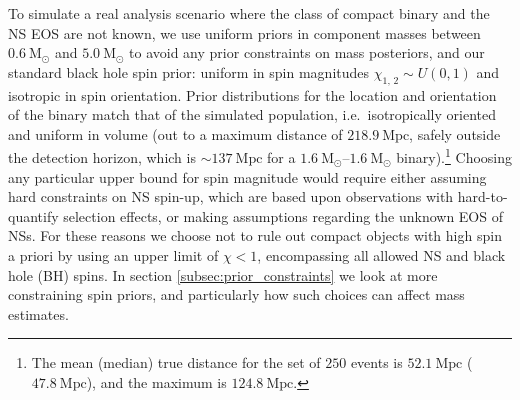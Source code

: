 To simulate a real analysis scenario where the class of compact binary and the NS EOS are not known, we use uniform priors in component masses between $0.6~\mathrm{M}_\odot$ and $5.0~\mathrm{M}_\odot$ to avoid any prior constraints on mass posteriors, and our standard black hole spin prior: uniform in spin magnitudes $\chi_{1,\,2} \sim U(0, 1)$ and isotropic in spin orientation. Prior distributions for the location and orientation of the binary match that of the simulated population, i.e.\ isotropically oriented and uniform in volume (out to a maximum distance of $218.9~\mathrm{Mpc}$, safely outside the detection horizon, which is $\sim137~\mathrm{Mpc}$ for a $1.6~\mathrm{M}_\odot$--$1.6~\mathrm{M}_\odot$ binary).\footnote{The mean (median) true distance for the set of $250$ events is $52.1~\mathrm{Mpc}$ ($47.8~\mathrm{Mpc}$), and the maximum is $124.8~\mathrm{Mpc}$.}  Choosing any particular upper bound for spin magnitude would require either assuming hard constraints on NS spin-up, which are based upon observations with hard-to-quantify selection effects, or making assumptions regarding the unknown EOS of NSs. For these reasons we choose not to rule out compact objects with high spin a priori by using an upper limit of $\chi < 1$, encompassing all allowed NS and black hole (BH) spins.  In section \ref{subsec:prior_constraints} we look at more constraining spin priors, and particularly how such choices can affect mass estimates.

